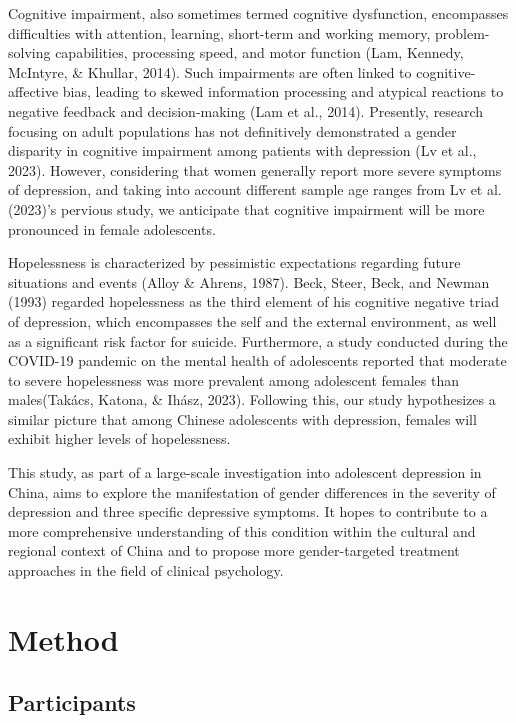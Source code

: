 \documentclass[
  man,floatsintext]{apa6}
\begin{document}
Cognitive impairment, also sometimes termed cognitive dysfunction, encompasses difficulties with attention, learning, short-term and working memory, problem-solving capabilities, processing speed, and motor function (Lam, Kennedy, McIntyre, \& Khullar, 2014). Such impairments are often linked to cognitive-affective bias, leading to skewed information processing and atypical reactions to negative feedback and decision-making (Lam et al., 2014). Presently, research focusing on adult populations has not definitively demonstrated a gender disparity in cognitive impairment among patients with depression (Lv et al., 2023). However, considering that women generally report more severe symptoms of depression, and taking into account different sample age ranges from Lv et al. (2023)'s pervious study, we anticipate that cognitive impairment will be more pronounced in female adolescents.

Hopelessness is characterized by pessimistic expectations regarding future situations and events (Alloy \& Ahrens, 1987). Beck, Steer, Beck, and Newman (1993) regarded hopelessness as the third element of his cognitive negative triad of depression, which encompasses the self and the external environment, as well as a significant risk factor for suicide. Furthermore, a study conducted during the COVID-19 pandemic on the mental health of adolescents reported that moderate to severe hopelessness was more prevalent among adolescent females than males(Takács, Katona, \& Ihász, 2023). Following this, our study hypothesizes a similar picture that among Chinese adolescents with depression, females will exhibit higher levels of hopelessness.

This study, as part of a large-scale investigation into adolescent depression in China, aims to explore the manifestation of gender differences in the severity of depression and three specific depressive symptoms. It hopes to contribute to a more comprehensive understanding of this condition within the cultural and regional context of China and to propose more gender-targeted treatment approaches in the field of clinical psychology.

\hypertarget{method}{%
\section{Method}\label{method}}

\hypertarget{participants}{%
\subsection{Participants}\label{participants}}
\end{document}
